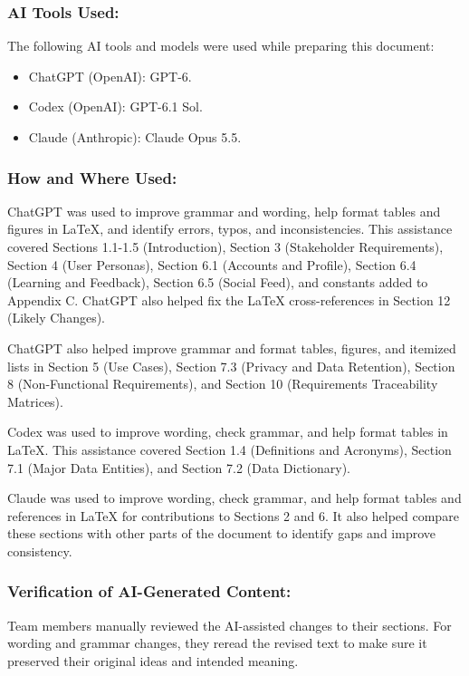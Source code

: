 \documentclass[12pt]{article}
\begin{document}
\subsubsection*{AI Tools Used:}

The following AI tools and models were used while preparing this document:
\begin{itemize}
    \item ChatGPT (OpenAI): GPT-6.
    \item Codex (OpenAI): GPT-6.1 Sol.
    \item Claude (Anthropic): Claude Opus 5.5.
\end{itemize}

\subsubsection*{How and Where Used:}

ChatGPT was used to improve grammar and wording, help format tables and figures in LaTeX, and identify errors, typos, and inconsistencies. This assistance covered Sections 1.1-1.5 (Introduction), Section 3 (Stakeholder Requirements), Section 4 (User Personas), Section 6.1 (Accounts and Profile), Section 6.4 (Learning and Feedback), Section 6.5 (Social Feed), and constants added to Appendix C. ChatGPT also helped fix the LaTeX cross-references in Section 12 (Likely Changes).

ChatGPT also helped improve grammar and format tables, figures, and itemized lists in Section 5 (Use Cases), Section 7.3 (Privacy and Data Retention), Section 8 (Non-Functional Requirements), and Section 10 (Requirements Traceability Matrices).

Codex was used to improve wording, check grammar, and help format tables in LaTeX. This assistance covered Section 1.4 (Definitions and Acronyms), Section 7.1 (Major Data Entities), and Section 7.2 (Data Dictionary).

Claude was used to improve wording, check grammar, and help format tables and references in LaTeX for contributions to Sections 2 and 6. It also helped compare these sections with other parts of the document to identify gaps and improve consistency.

\subsubsection*{Verification of AI-Generated Content:}

Team members manually reviewed the AI-assisted changes to their sections. For wording and grammar changes, they reread the revised text to make sure it preserved their original ideas and intended meaning.
\end{document}
